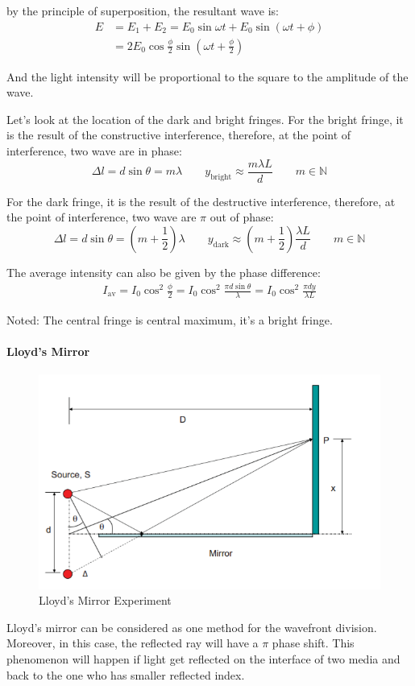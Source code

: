 \documentclass[openany]{book}
\begin{document}
by the principle of superposition, the resultant wave is:
\begin{align*}
E&=E_1+E_2=E_0\sin \omega t+E_0\sin (\omega t+\phi )\\
&=2E_0\cos \frac{\phi}{2}\sin \left(\omega t+\frac{\phi}{2}\right)
\end{align*}

And the light intensity will be proportional to the square to the amplitude of the wave. 

Let's look at the location of the dark and bright fringes. For the bright fringe, it is the result of the constructive interference, therefore, at the point of interference, two wave are in phase:
\[\Delta l=d\sin \theta =m\lambda\qquad y_{\textrm{bright}}\approx \frac{m\lambda L}{d} \qquad m\in \mathbb{N}\]

For the dark fringe, it is the result of the destructive interference, therefore, at the point of interference, two wave are $\pi $ out of phase:
\[\Delta l=d\sin \theta =\left(m+\frac{1}{2}\right)\lambda \qquad y_{\textrm{dark}}\approx \left(m+\frac{1}{2}\right)\frac{\lambda L}{d} \qquad m\in \mathbb{N}\]

The average intensity can also be given by the phase difference:
\begin{align*}
I_{\textrm{av}}=I_0\cos ^2\frac{\phi}{2}=I_0\cos ^2 \frac{\pi d\sin \theta}{\lambda}=I_0\cos ^2 \frac{\pi d y}{\lambda L}
\end{align*}

Noted: The central fringe is central maximum, it's a bright fringe.

\paragraph{Lloyd's Mirror}
\begin{figure}[H]
\centering
\label{fig:18}
\includegraphics[scale=0.8]{Figure/18.PNG}
\caption{Lloyd's Mirror Experiment}
\end{figure}
Lloyd's mirror can be considered as one method for the wavefront division. Moreover, in this case, the reflected ray will have a $\pi $ phase shift. This phenomenon will happen if light get reflected on the interface of two media and back to the one who has smaller reflected index.
\end{document}
